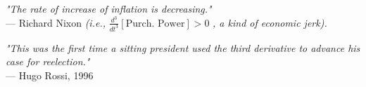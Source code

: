 \begin{flushright}
\emph{"The rate of increase of inflation is decreasing."}\\
— Richard Nixon \textit{(i.e., } $\frac{d^3}{dt^3}[\text{Purch. Power}] > 0$ \textit{, a kind of economic jerk).}
\end{flushright}

\begin{flushright}
\emph{"This was the first time a sitting president used the third derivative to advance his case for reelection."}\\
— Hugo Rossi, 1996
\end{flushright}
